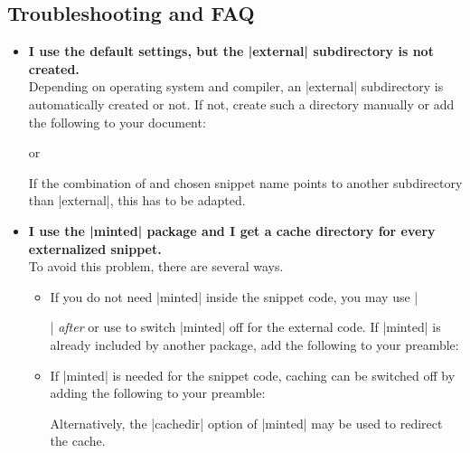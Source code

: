 \subsection{Troubleshooting and FAQ}\label{subsec:external_troubleshooting}

\begin{itemize}

\item\textbf{I use the default settings, but the |external| subdirectory is
  not created.}\\
  Depending on operating system and compiler, an |external| subdirectory is
  automatically created or not. If not, create such a directory manually
  or add the following to your document:
\begin{dispListing}
\immediate{}
\end{dispListing}
or
\begin{dispListing}
\immediate{}
\end{dispListing}
  If the combination of  and chosen snippet
  name points to another subdirectory than |external|, this has to be
  adapted.

\item\textbf{I use the |minted| package and I get a cache directory for
  every externalized snippet.}\\
  To avoid this problem, there are several ways.
  \begin{itemize}
  \item If you do not need |minted| inside the snippet code, you may use
    |\usepackage{minted}| \emph{after} 
    or use  to switch |minted| off for the external code.
    If |minted| is already included by another package, add the following to
    your preamble:
\begin{dispListing}
\end{dispListing}
  \item If |minted| is needed for the snippet code, caching can be switched
    off by adding the following to your preamble:
\begin{dispListing}
\end{dispListing}
  Alternatively, the |cachedir| option of |minted| may be used to redirect
  the cache.
  \end{itemize}


\end{itemize}

